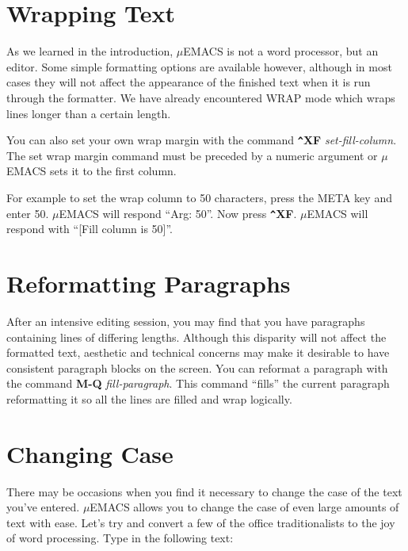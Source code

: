 \section{Wrapping Text}

As we learned in the introduction, $\mu$EMACS is not a word processor,
but an editor. Some simple formatting options are available however,
although in most cases they will not affect the appearance of the
finished text when it is run through the formatter. We have already
encountered WRAP mode which wraps lines longer than a certain length.

You can also set your own wrap margin with the command {\bf \verb+^+XF}
{\it set-fill-column}. The set wrap margin command must be preceded by
a numeric argument or $\mu$EMACS sets it to the first column.

For example to set the wrap column to 50 characters, press the META key
and enter 50. $\mu$EMACS will respond ``Arg: 50''. Now press {\bf
\verb+^+XF}. $\mu$EMACS will respond with ``[Fill column is 50]''.
\section{Reformatting Paragraphs}

After an intensive editing session, you may find that you have
paragraphs containing lines of differing lengths. Although this
disparity will not affect the formatted text, aesthetic and technical
concerns may make it desirable to have consistent paragraph blocks on
the screen. You can reformat a paragraph with the command {\bf M-Q}
{\it fill-paragraph}. This command ``fills'' the current paragraph
reformatting it so all the lines are filled and wrap logically.

\section{Changing Case}

There may be occasions when you find it necessary to change the case of
the text you've entered. $\mu$EMACS allows you to change the case of even
large amounts of text with ease. Let's try and convert a few of the
office traditionalists to the joy of word processing. Type in the
following text:

